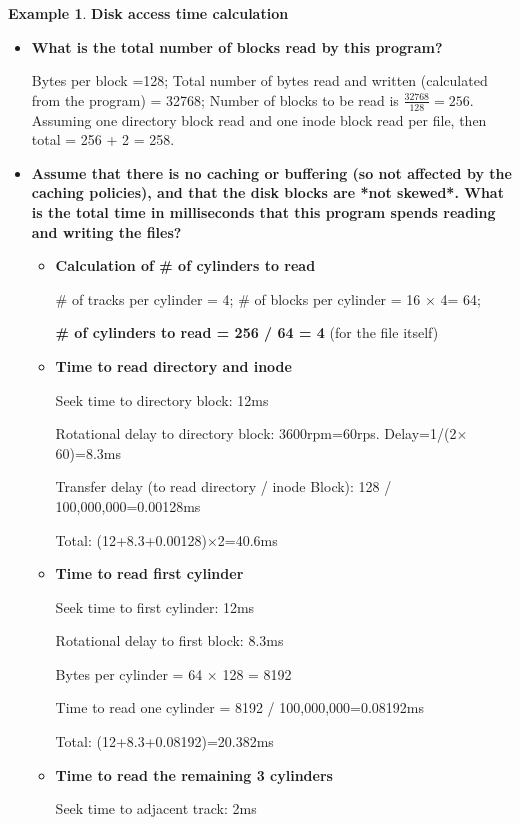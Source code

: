 \documentclass[11pt,a4paper]{article}
\theoremstyle{definition}
\newtheorem{example}{Example}[section]
\newenvironment{myitemize}
{ \begin{itemize}
    \setlength{\itemsep}{5pt}
    \setlength{\parskip}{0pt}
    \setlength{\parsep}{0pt}     }
{ \end{itemize}                  }
\begin{document}
\begin{example}{\textbf{Disk access time calculation}}
	\begin{myitemize}
		\item \textbf{What is the total number of blocks read by this program?}
		
		Bytes per block =128; Total number of bytes read and written (calculated from the program) = 32768; Number of blocks to be read is $\frac{32768}{128}=256$. Assuming one directory block read and one inode block read per file, then total = 256 + 2 = 258.
		
		\item \textbf{Assume that there is no caching or buffering (so not affected by the caching policies), and that the disk blocks are *not skewed*. What is the total time in milliseconds that this program spends reading and writing the files?}
		\begin{myitemize}
			\item \textbf{Calculation of \# of cylinders to read}

			\# of tracks per cylinder = 4; \# of blocks per cylinder = 16 $\times$ 4= 64; 
			
			\textbf{\# of cylinders to read = 256 / 64 = 4} (for the file itself)
			
			\item \textbf{Time to read directory and inode}
			
			Seek time to directory block: 12ms
		
			Rotational delay to directory block: 3600rpm=60rps. Delay=1/(2$\times$60)=8.3ms
			
			Transfer delay (to read directory / inode Block): 128 / 100,000,000=0.00128ms
			
			Total: (12+8.3+0.00128)$\times$2=40.6ms
			\item \textbf{Time to read first cylinder}
			
			Seek time to first cylinder: 12ms
			
			Rotational delay to first block: 8.3ms
			
			Bytes per cylinder = 64 $\times$ 128 = 8192
			
			Time to read one cylinder = 8192 / 100,000,000=0.08192ms
			
			Total: (12+8.3+0.08192)=20.382ms
			
			\item \textbf{Time to read the remaining 3 cylinders}
			
			Seek time to adjacent track: 2ms
			

\end{myitemize}
\end{myitemize}
\end{example}
\end{document}
